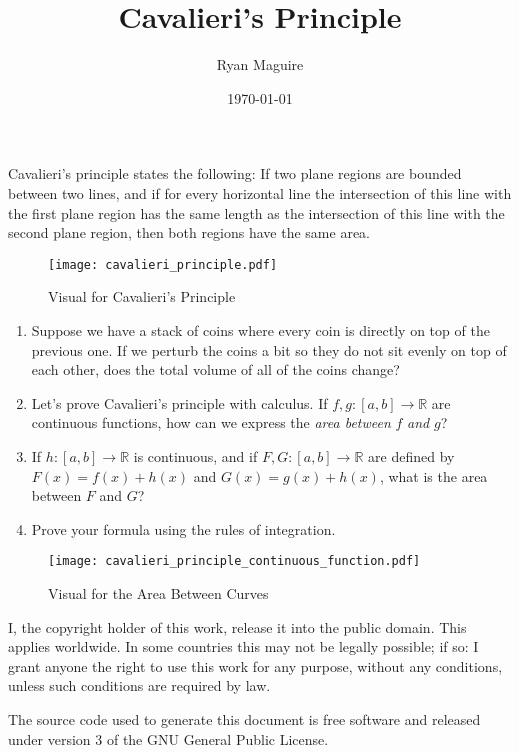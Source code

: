 \documentclass{article}
\title{Cavalieri's Principle}
\author{Ryan Maguire}
\date{\today}
\begin{document}
    \maketitle
        Cavalieri's principle states the following:
        If two plane regions are bounded between two lines, and if for every
        horizontal line the intersection of this line with the first plane
        region has the same length as the intersection of this line with the
        second plane region, then both regions have the same area.
    \begin{figure}
        \centering
        \texttt{[image: cavalieri\_principle.pdf]}
        \caption{Visual for Cavalieri's Principle}
    \end{figure}
    \begin{enumerate}
        \item
            Suppose we have a stack of coins where every coin is directly on
            top of the previous one. If we perturb the coins a bit so they do
            not sit evenly on top of each other, does the total volume of all
            of the coins change?
        \item
            Let's prove Cavalieri's principle with calculus. If
            $f,g:[a,b]\rightarrow\mathbb{R}$ are continuous functions, how
            can we express the \textit{area between} $f$ \textit{and} $g$?
        \item
            If $h:[a,b]\rightarrow\mathbb{R}$ is continuous, and if
            $F,G:[a,b]\rightarrow\mathbb{R}$ are defined by
            $F(x)=f(x)+h(x)$ and $G(x)=g(x)+h(x)$, what is the area
            between $F$ and $G$?
        \item
            Prove your formula using the rules of integration.
    \end{enumerate}
    \begin{figure}
        \centering
        \texttt{[image: cavalieri\_principle\_continuous\_function.pdf]}
        \caption{Visual for the Area Between Curves}
    \end{figure}
    \newpage
    I, the copyright holder of this work, release it into the public domain.
    This applies worldwide. In some countries this may not be legally possible;
    if so: I grant anyone the right to use this work for any purpose, without
    any conditions, unless such conditions are required by law.
    \par\hfill\par
    The source code used to generate this document is free software and released
    under version 3 of the GNU General Public License.
\end{document}
